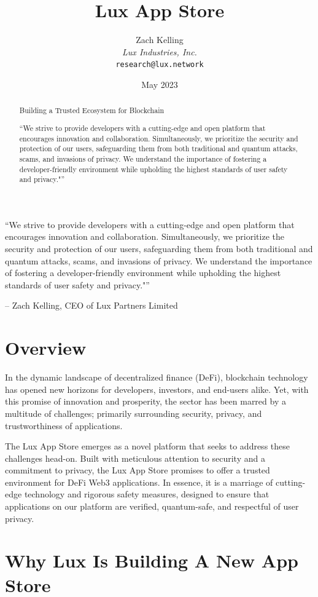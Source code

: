 \documentclass[11pt]{article}
\title{Lux App Store}
\author{Zach Kelling\\\textit{Lux Industries, Inc.}\\\texttt{research@lux.network}}
\date{May 2023}
\begin{document}
\luxcoverpage

\begin{abstract}
Building a Trusted Ecosystem for Blockchain

``We strive to provide developers with a cutting-edge and open platform that encourages innovation and collaboration. Simultaneously, we prioritize the security and protection of our users, safeguarding them from both traditional and quantum attacks, scams, and invasions of privacy. We understand the importance of fostering a developer-friendly environment while upholding the highest standards of user safety and privacy."''
\end{abstract}

\tableofcontents
\newpage


``We strive to provide developers with a cutting-edge and open platform that encourages innovation and collaboration. Simultaneously, we prioritize the security and protection of our users, safeguarding them from both traditional and quantum attacks, scams, and invasions of privacy. We understand the importance of fostering a developer-friendly environment while upholding the highest standards of user safety and privacy."''


--  Zach Kelling, CEO of Lux Partners Limited


\section{Overview}

In the dynamic landscape of decentralized finance (DeFi), blockchain technology has opened new horizons for developers, investors, and end-users alike. Yet, with this promise of innovation and prosperity, the sector has been marred by a multitude of challenges; primarily surrounding security, privacy, and trustworthiness of applications.


The Lux App Store emerges as a novel platform that seeks to address these challenges head-on. Built with meticulous attention to security and a commitment to privacy, the Lux App Store promises to offer a trusted environment for DeFi Web3 applications. In essence, it is a marriage of cutting-edge technology and rigorous safety measures, designed to ensure that applications on our platform are verified, quantum-safe, and respectful of user privacy.


\section{Why Lux Is Building A New App Store}
\end{document}

